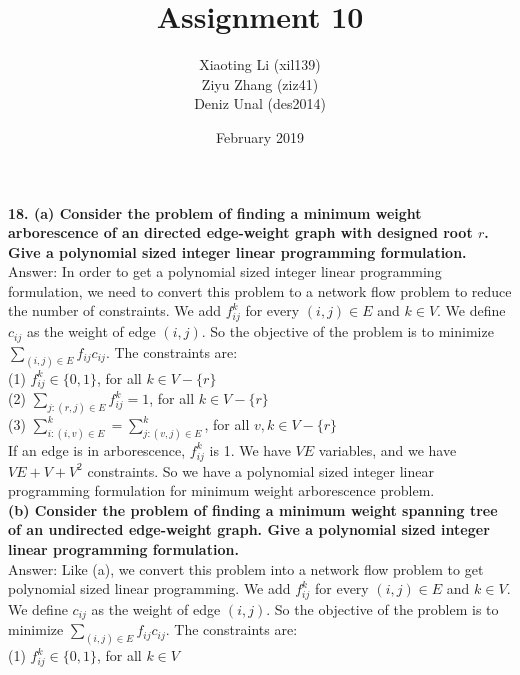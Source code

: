 \documentclass{article}
\title{Assignment 10}
\author{Xiaoting Li (xil139) \\
Ziyu Zhang (ziz41) \\
Deniz Unal (des2014)}
\date{February 2019}
\begin{document}
\maketitle

\noindent
\textbf{18.
(a) Consider the problem of finding a minimum weight arborescence of an directed edge-weight graph with designed root $r$. Give a polynomial sized integer linear programming formulation.} \\ \newline
Answer: In order to get a polynomial sized integer linear programming formulation, we need to convert this problem to a network flow problem to reduce the number of constraints. We add $f_{ij}^{k}$ for every $(i, j)\in E$ and $k\in V$. We define $c_{ij}$ as the weight of edge $(i, j)$. So the objective of the problem is to minimize $\sum_{(i,j)\in E}f_{ij}c_{ij}$. The constraints are: \\\newline
(1) $f_{ij}^{k}\in \{{0, 1}\}$, for all $k\in V - \{{r}\}$\\ \newline
(2) $\sum_{j:(r,j)\in E} f_{ij}^{k} = 1$, for all $k\in V - \{{r}\}$ \\ \newline
(3) $\sum_{i: (i,v)\in E}^{k} = \sum_{j:(v, j)\in E}^{k}$, for all $v, k\in V - \{{r}\}$ \\ \newline
If an edge is in arborescence, $f_{ij}^{k}$ is 1. We have $VE$ variables, and we have $VE + V + V^2$ constraints. So we have a polynomial sized integer linear programming formulation for minimum weight arborescence problem.\\ \newline
\textbf{(b) Consider the problem of finding a minimum weight spanning tree of an undirected edge-weight graph. Give a polynomial sized integer linear programming formulation.}\\ \newline
Answer: Like (a), we convert this problem into a network flow problem to get polynomial sized linear programming. We add $f_{ij}^{k}$ for every $(i, j)\in E$ and $k\in V$. We define $c_{ij}$ as the weight of edge $(i, j)$. So the objective of the problem is to minimize $\sum_{(i,j)\in E}f_{ij}c_{ij}$. The constraints are: \\ \newline
(1) $f_{ij}^{k}\in \{{0, 1}\}$, for all $k\in V$\\ \newline
\end{document}
